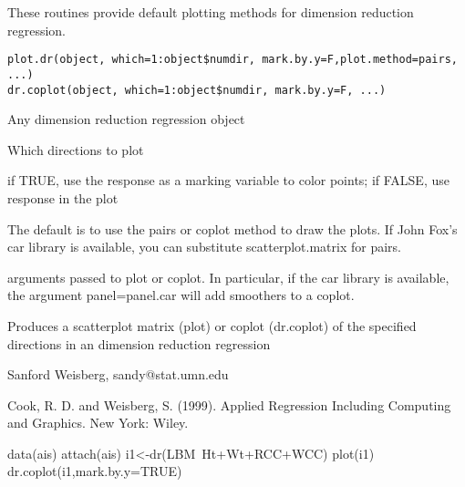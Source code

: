 \begin{Description}\relax
These routines provide default plotting methods for dimension reduction regression.\end{Description}
\begin{Usage}
\begin{verbatim}
plot.dr(object, which=1:object$numdir, mark.by.y=F,plot.method=pairs, ...)
dr.coplot(object, which=1:object$numdir, mark.by.y=F, ...)
\end{verbatim}
\end{Usage}
\begin{Arguments}
\begin{ldescription}
\item[\code{object}] Any dimension reduction regression object
\item[\code{which}] Which directions to plot
\item[\code{mark.by.y}] if TRUE, use the response as a marking variable to color
points; if FALSE, use response in the plot
\item[\code{plot.method}] The default is to use the pairs or coplot method to
draw the plots.  If John Fox's car library is available, you can
substitute scatterplot.matrix for pairs.
\item[\code{...}] arguments passed to plot or coplot.  In particular, if the
car library is available, the argument panel=panel.car will add smoothers
to a coplot.
\end{ldescription}
\end{Arguments}
\begin{Value}
Produces a scatterplot matrix (plot) or coplot (dr.coplot) of the specified
directions in an dimension reduction regression\end{Value}
\begin{Author}\relax
Sanford Weisberg, sandy@stat.umn.edu\end{Author}
\begin{References}\relax
Cook, R. D. and Weisberg, S. (1999).  Applied Regression
Including Computing and Graphics.  New York:  Wiley.\end{References}
\begin{Examples}
\begin{ExampleCode}
data(ais)
attach(ais)
i1<-dr(LBM~Ht+Wt+RCC+WCC)
plot(i1)
dr.coplot(i1,mark.by.y=TRUE)
\end{ExampleCode}
\end{Examples}

